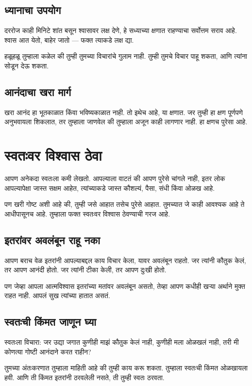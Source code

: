 \section*{ध्यानाचा उपयोग}
दररोज काही मिनिटे शांत बसून श्वासावर लक्ष देणे, 
हे सध्याच्या क्षणात राहण्याचा सर्वोत्तम सराव आहे. 
श्वास आत येतो, बाहेर जातो — 
फक्त त्याकडे लक्ष द्या. 

हळूहळू तुम्हाला कळेल की तुम्ही तुमच्या विचारांचे गुलाम नाही. 
तुम्ही तुमचे विचार पाहू शकता, 
आणि त्यांना सोडून देऊ शकता. 

\section*{आनंदाचा खरा मार्ग}
खरा आनंद हा भूतकाळात किंवा भविष्यकाळात नाही. 
तो इथेच आहे, या क्षणात. 
जर तुम्ही हा क्षण पूर्णपणे अनुभवायला शिकलात, 
तर तुम्हाला जाणवेल की तुम्हाला अजून काही लागणार नाही. 
हा क्षणच पुरेसा आहे. 



\chapter{स्वतःवर विश्वास ठेवा}

आपण अनेकदा स्वतःला कमी लेखतो. 
आपल्याला वाटतं की आपण पुरेसे चांगले नाही, 
इतर लोक आपल्यापेक्षा जास्त सक्षम आहेत, 
त्यांच्याकडे जास्त कौशल्यं, पैसा, संधी किंवा ओळख आहे. 

पण खरी गोष्ट अशी आहे की, 
तुम्ही जसे आहात तसेच पुरेसे आहात. 
तुमच्यात जे काही आवश्यक आहे ते आधीपासूनच आहे. 
तुम्हाला फक्त स्वतःवर विश्वास ठेवण्याची गरज आहे. 

\section*{इतरांवर अवलंबून राहू नका}
आपण बराच वेळ इतरांनी आपल्याबद्दल काय विचार केला, 
यावर अवलंबून राहतो. 
जर त्यांनी कौतुक केलं, तर आपण आनंदी होतो. 
जर त्यांनी टीका केली, तर आपण दुःखी होतो. 

पण जेव्हा आपला आत्मविश्वास इतरांच्या मतांवर अवलंबून असतो, 
तेव्हा आपण कधीही खऱ्या अर्थाने मुक्त राहत नाही. 
आपलं सुख त्यांच्या हातात असतं. 

\section*{स्वतःची किंमत जाणून घ्या}
स्वतःला विचारा: 
जर उद्या जगात कुणीही माझं कौतुक केलं नाही, 
कुणीही मला ओळखलं नाही, 
तरी मी कोणत्या गोष्टी आनंदाने करत राहीन? 

तुमच्या अंतःकरणात तुम्हाला माहिती आहे की तुम्ही काय करू शकता. 
तुम्हाला स्वतःची किंमत ओळखायला हवी. 
आणि ती किंमत इतरांनी ठरवलेली नसते, 
ती तुम्ही स्वतः ठरवता. 

